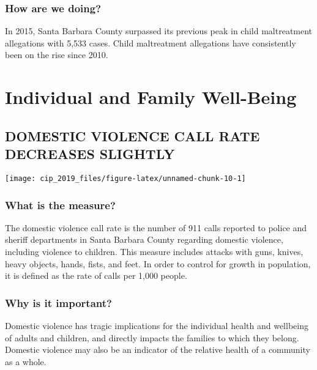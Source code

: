 \documentclass[]{book}
\theoremstyle{definition}
\theoremstyle{definition}
\theoremstyle{definition}
\theoremstyle{remark}
\begin{document}
\subsubsection*{How are we doing?}\label{how-are-we-doing-3}

In 2015, Santa Barbara County surpassed its previous peak in child
maltreatment allegations with 5,533 cases. Child maltreatment
allegations have consistently been on the rise since 2010.

\section*{Individual and Family
Well-Being}\label{individual-and-family-well-being}

\subsection*{DOMESTIC VIOLENCE CALL RATE DECREASES
SLIGHTLY}\label{domestic-violence-call-rate-decreases-slightly}

\texttt{[image: cip\_2019\_files/figure-latex/unnamed-chunk-10-1]}

\subsubsection*{What is the measure?}\label{what-is-the-measure-2}

The domestic violence call rate is the number of 911 calls reported to
police and sheriff departments in Santa Barbara County regarding
domestic violence, including violence to children. This measure includes
attacks with guns, knives, heavy objects, hands, fists, and feet. In
order to control for growth in population, it is defined as the rate of
calls per 1,000 people.

\subsubsection*{Why is it important?}\label{why-is-it-important-2}

Domestic violence has tragic implications for the individual health and
wellbeing of adults and children, and directly impacts the families to
which they belong. Domestic violence may also be an indicator of the
relative health of a community as a whole.
\end{document}
